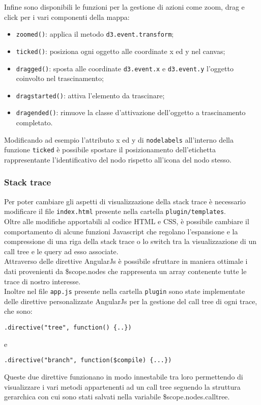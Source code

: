 Infine sono disponibili le funzioni per la gestione di azioni come zoom, drag e click per i vari componenti della mappa:
\begin{itemize}
	\item \texttt{zoomed()}: applica il metodo \texttt{d3.event.transform};
	\item \texttt{ticked()}: posiziona ogni oggetto alle coordinate x ed y nel canvas;
	\item \texttt{dragged()}: sposta alle coordinate \texttt{d3.event.x} e \texttt{d3.event.y} l'oggetto coinvolto nel trascinamento;
	\item \texttt{dragstarted()}: attiva l'elemento da trascinare;
	\item \texttt{dragended()}: rimuove la classe d'attivazione dell'oggetto a trascinamento completato.
\end{itemize}
Modificando ad esempio l'attributo x ed y di \texttt{nodelabels} all'interno della funzione \texttt{ticked} è possibile spostare il posizionamento dell'etichetta rappresentante l'identificativo del nodo rispetto all'icona del nodo stesso.\\

\subsubsection{Stack trace}
\label{sec:stack}
Per poter cambiare gli aspetti di visualizzazione della stack trace è necessario modificare il file \texttt{index.html} presente nella cartella \texttt{plugin/templates}.\\
Oltre alle modifiche apportabili al codice HTML e CSS, è possibile cambiare il comportamento di alcune funzioni Javascript che regolano l'espansione e la compressione di una riga della stack trace o lo switch tra la visualizzazione di un call tree e le query ad esso associate.\\
Attraverso delle direttive AngularJs è possibile sfruttare in maniera ottimale i dati provenienti da \$scope.nodes che rappresenta un array contenente tutte le trace di nostro interesse.\\
Inoltre nel file \texttt{app.js} presente nella cartella \texttt{plugin} sono state implementate delle direttive personalizzate AngularJs per la gestione del call tree di ogni trace, che sono:
\begin{lstlisting}
.directive("tree", function() {..})
\end{lstlisting}
e
\begin{lstlisting}
.directive("branch", function($compile) {...})
\end{lstlisting}
Queste due direttive funzionano in modo innestabile tra loro permettendo di visualizzare i vari metodi appartenenti ad un call tree seguendo la struttura gerarchica con cui sono stati salvati nella variabile \$scope.nodes.calltree.


